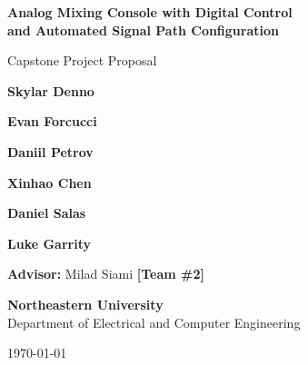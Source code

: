 \documentclass[11pt, letterpaper,titlepage]{article}
\begin{document}
\begin{titlepage}
    \centering
    \vspace*{0cm}
    
    {\huge \textbf{Analog Mixing Console with Digital Control\\ \vspace{0.5cm}and Automated Signal Path Configuration}} \\[1cm]
    
    \vspace{0.5cm}
    
    {\huge Capstone Project Proposal}
    
    \vspace{5cm}
    




    
    {\Large \textbf{Skylar Denno}}
    
    \vspace{0.3cm}
    
    {\Large \textbf{Evan Forcucci}}
    
        \vspace{0.3cm}
    
    {\Large \textbf{Daniil Petrov}}
    
        \vspace{0.3cm}
    
    {\Large \textbf{Xinhao Chen}}
    
        \vspace{0.3cm}
    
    {\Large \textbf{Daniel Salas}}
    
        \vspace{0.3cm}
    
    {\Large \textbf{Luke Garrity}}
    

    
    \vspace{0.5cm}
    
        {\large \textbf{Advisor: }Milad Siami \textbf{[Team \#2]}}
    
        \vspace{1.3cm}

    
        {\LARGE \textbf{Northeastern University}} \\
        
    Department of Electrical and Computer Engineering \\
    \vspace{1cm}
    
    
    \today

\end{titlepage}
\setlength{\parindent}{6pt}
\end{document}
